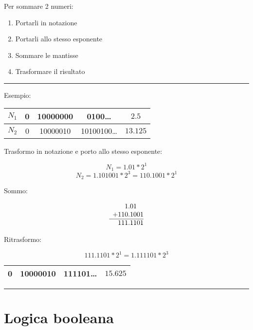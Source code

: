 \documentclass{article}
\begin{document}
Per sommare 2 numeri:
\begin{enumerate}
    \item Portarli in notazione
    \item Portarli allo stesso esponente
    \item Sommare le mantisse
    \item Trasformare il risultato
\end{enumerate}

\newpage

\noindent\rule{\textwidth}{0.5pt}

\noindent Esempio:

\begin{table}[ht]
    \centering
    \begin{tabular}{|c|c|c|c|c|}
        \hline
        $N_1$ & 0 & 10000000 & 0100\ldots & $2.5$\\
        \hline
        $N_2$ & 0 & 10000010 & 10100100\ldots & $13.125$\\
        \hline
    \end{tabular}
\end{table}

\noindent Trasformo in notazione e porto allo stesso esponente:

$$N_1=1.01*2^1$$
$$N_2=1.101001*2^3 = 110.1001*2^1$$

\noindent Sommo:

\[
\begin{array}{c@{}c@{}c@{}c@{}c@{}c@{}c@{}c@{}}
   & & & 1. & 0 & 1 \\
 + & 1 & 1 & 0. & 1 & 0 & 0 & 1 \\
\hline
 & 1 & 1 & 1. & 1 & 1 & 0 & 1
\end{array}
\]

\noindent Ritrasformo:

 $$111.1101*2^1=1.111101*2^3$$

\begin{table}[ht]
    \centering
    \begin{tabular}{|c|c|c|c|}
        \hline
        0 & 10000010 & 111101\ldots & $15.625$\\
        \hline
    \end{tabular}
\end{table}

\noindent\rule{\textwidth}{0.5pt}

\section{Logica booleana}
\end{document}
